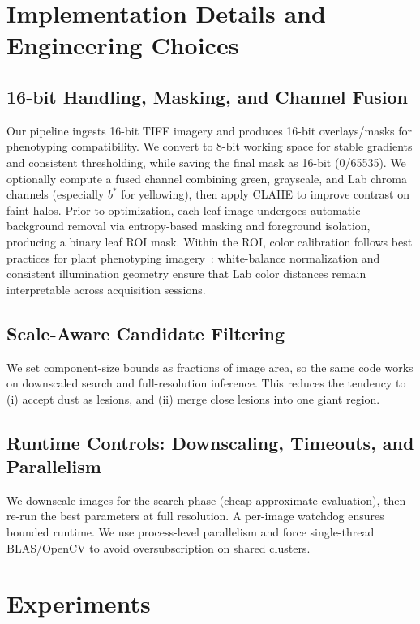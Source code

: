 \documentclass[11pt,a4paper]{article}
\begin{document}
\section{Implementation Details and Engineering Choices}

\subsection{16-bit Handling, Masking, and Channel Fusion}
Our pipeline ingests 16-bit TIFF imagery and produces 16-bit overlays/masks for phenotyping compatibility.
We convert to 8-bit working space for stable gradients and consistent thresholding, while saving the final mask as 16-bit (0/65535).
We optionally compute a fused channel combining green, grayscale, and Lab chroma channels (especially $b^\ast$ for yellowing), then apply CLAHE to improve contrast on faint halos.
Prior to optimization, each leaf image undergoes automatic background removal via entropy-based masking and foreground isolation, producing a binary leaf ROI mask. Within the ROI, color calibration follows best practices for plant phenotyping imagery~\citep{berry2018color}: white-balance normalization and consistent illumination geometry ensure that Lab color distances remain interpretable across acquisition sessions.

\subsection{Scale-Aware Candidate Filtering}
We set component-size bounds as fractions of image area, so the same code works on downscaled search and full-resolution inference. This reduces the tendency to (i) accept dust as lesions, and (ii) merge close lesions into one giant region.

\subsection{Runtime Controls: Downscaling, Timeouts, and Parallelism}
We downscale images for the search phase (cheap approximate evaluation), then re-run the best parameters at full resolution. A per-image watchdog ensures bounded runtime. We use process-level parallelism and force single-thread BLAS/OpenCV to avoid oversubscription on shared clusters.

\section{Experiments}
\end{document}

